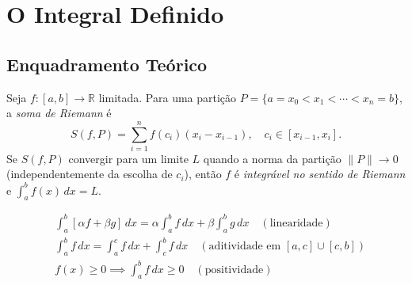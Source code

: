
\section{O Integral Definido}

\subsection{Enquadramento Teórico}

\begin{defbox}[title={Integral de Riemann}]
  Seja $f:[a,b]\to\mathbb{R}$ limitada. Para uma partição
  $P=\{a=x_0<x_1<\cdots<x_n=b\}$, a \emph{soma de Riemann} é
  \[
    S(f,P) = \sum_{i=1}^n f(c_i)(x_i - x_{i-1}),\quad c_i\in[x_{i-1},x_i].
  \]
  Se $S(f,P)$ convergir para um limite $L$ quando a norma da partição
  $\|P\|\to 0$ (independentemente da escolha de $c_i$), então $f$ é
  \emph{integrável no sentido de Riemann} e $\displaystyle\int_a^b f(x)\,dx = L$.
\end{defbox}

\begin{thmbox}[title={Propriedades Principais do Integral Definido}]
\begin{align*}
  &\int_a^b [\alpha f+\beta g]\,dx = \alpha\int_a^b f\,dx + \beta\int_a^b g\,dx
    \quad (\text{linearidade})\\[4pt]
  &\int_a^b f\,dx = \int_a^c f\,dx + \int_c^b f\,dx
    \quad (\text{aditividade em } [a,c]\cup[c,b])\\[4pt]
  &f(x)\geq 0 \implies \int_a^b f\,dx \geq 0
    \quad (\text{positividade})
\end{align*}
\end{thmbox}
